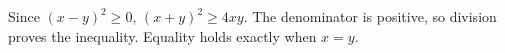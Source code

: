 Since $(x-y)^2\ge0$, $(x+y)^2\ge4xy$. The denominator is positive, so division proves the inequality. Equality holds exactly when $\boxed{x=y}$.
